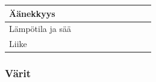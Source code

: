 \documentclass[finnish, 12pt, a4paper, elec, utf8, a-1b, online]{aaltothesis}
\begin{document}
{\begin{longtable}{p{2.5cm}|p{6cm}|p{0.5cm}p{0.5cm}p{0.5cm}|p{0.5cm}|p{0.5cm}p{0.5cm}p{0.5cm}|p{0.5cm}|}
        \midrule
        Äänekkyys                                                                                                                                                                                                                                                                                                                                                                                                                   \\
        \midrule
        Lämpötila ja sää                                                                                                                                                                                                                                                                                                                                                                                                            \\
        \midrule
        Liike                                                                                                                                                                                                                                                                                                                                                                                                                       \\
    \end{longtable}
}

\subsubsection{Värit}
\end{document}
